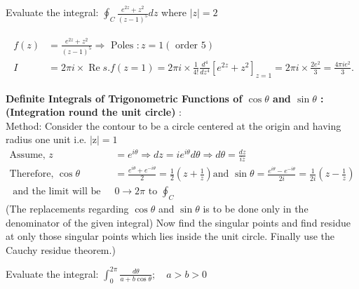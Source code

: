 \begin{exercise}
	Evaluate the integral: $\oint_{C} \frac{e^{2 z}+z^{2}}{(z-1)^{5}} d z$ where $|z|=2$
\end{exercise}
\begin{answer}
	\begin{align*}
	\begin{aligned}
	f(z)&=\frac{e^{2 z}+z^{2}}{(z-1)^{5}} \Rightarrow \text { Poles }: z=1(\text { order } 5) \\
	I&=2 \pi i \times \operatorname{Re} s . f(z=1)=2 \pi i \times \frac{1}{4 !} \frac{d^{4}}{d z^{4}}\left[e^{2 z}+z^{2}\right]_{z=1}=2 \pi i \times \frac{2 e^{2}}{3}=\frac{4 \pi i e^{2}}{3} .
	\end{aligned}
	\end{align*}
\end{answer}
\textbf{Definite Integrals of Trigonometric Functions of $\cos\theta$ and $\sin\theta$ : (Integration round the unit circle)} :\\
	Method: Consider the contour to be a circle centered at the origin and having radius one unit i.e. $|\mathrm{z}|=1$
\begin{align*}
	\text{Assume, }z&=e^{i \theta} \Rightarrow d z=i e^{i \theta} d \theta \Rightarrow d \theta=\frac{d z}{i z}\\
	\text{Therefore, }\cos \theta&=\frac{e^{i \theta}+e^{-i \theta}}{2}=\frac{1}{2}\left(z+\frac{1}{z}\right)
	 \text{and }\sin \theta=\frac{e^{i \theta}-e^{-i \theta}}{2 i}=\frac{1}{2 i}\left(z-\frac{1}{z}\right)\\
	 \text { and the limit will be changed from }& 0 \rightarrow 2 \pi \text { to } \oint_{C}
\end{align*}
(The replacements regarding $\cos \theta$ and $\sin \theta$ is to be done only in the denominator of the given integral) Now find the singular points and find residue at only those singular points which lies inside the unit circle. Finally use the Cauchy residue theorem.)
\begin{exercise}
	Evaluate the integral: $\int_{0}^{2 \pi} \frac{d \theta}{a+b \cos \theta} ; \quad a>b>0$
\end{exercise}

